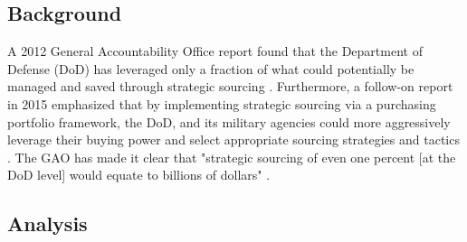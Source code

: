 \documentclass[twocolumn]{svjour3}       %
\begin{document}
\subsection{Background}
\label{sec:5.1}

A 2012 General Accountability Office \citep{gao} report found that the Department of Defense (DoD) has leveraged only a fraction of what could potentially be managed and saved through strategic sourcing \citep{gao}.  Furthermore, a follow-on report in 2015 emphasized that by implementing strategic sourcing via a purchasing portfolio framework, the DoD, and its military agencies could more aggressively leverage their buying power and select appropriate sourcing strategies and tactics \citep{gao2}.  The GAO has made it clear that "strategic sourcing of even one percent [at the DoD level] would equate to billions of dollars" \citep{gao}.



\subsection{Analysis}
\label{sec:5.2}
\end{document}

